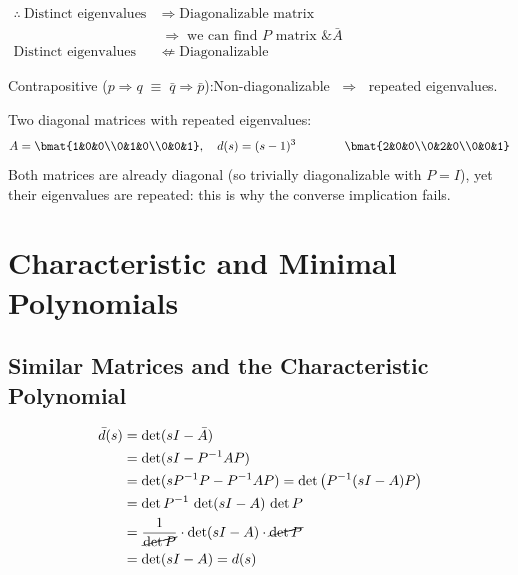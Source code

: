 \begin{keybox}
\noindent\hfil$\displaystyle\begin{aligned}
\therefore\ \text{Distinct eigenvalues} &\;\Rightarrow\; \text{Diagonalizable matrix}\\
&\;\Rightarrow\; \text{we can find $P$ matrix \& $\bar A$}\\[2pt]
\text{Distinct eigenvalues} &\;\not\Leftarrow\; \text{Diagonalizable}
\end{aligned}$\hfil\par\smallskip
Contrapositive ($p\Rightarrow q \;\equiv\; \bar q\Rightarrow \bar p$):\quad Non-diagonalizable $\;\Rightarrow\;$ repeated eigenvalues.
\end{keybox}
Two diagonal matrices with repeated eigenvalues:
\[
A=\bmat{1&0&0\\0&1&0\\0&0&1},\quad d(s)=(s-1)^3
\qquad\qquad
\bmat{2&0&0\\0&2&0\\0&0&1}
\]
Both matrices are already diagonal (so trivially diagonalizable with $P=I$), yet their eigenvalues are repeated: this is why the converse implication fails.

\section{Characteristic and Minimal Polynomials}\label{sec:polys}
\subsection{Similar Matrices and the Characteristic Polynomial}\label{ss:charpoly}
%
\begin{align*}
\bar d(s) &= \det(sI-\bar A)\\
&= \det(sI-P^{-1}AP)\\
&= \det(sP^{-1}P-P^{-1}AP) = \det\big(P^{-1}(sI-A)P\big)\\
&= \det P^{-1}\,\det(sI-A)\,\det P\\
&= \frac{1}{\cancel{\det P}}\cdot\det(sI-A)\cdot\cancel{\det P}\\
&= \det(sI-A) = d(s)
\end{align*}

